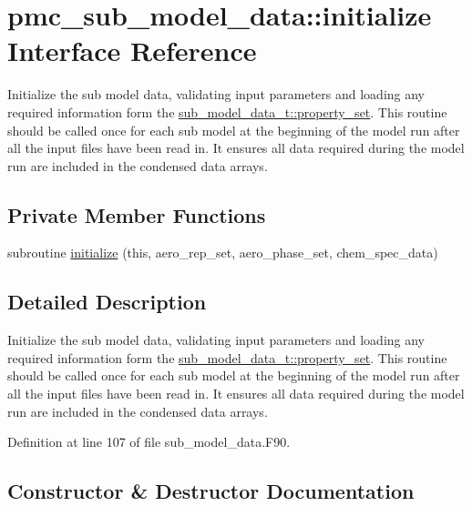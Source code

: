 \hypertarget{interfacepmc__sub__model__data_1_1initialize}{}\section{pmc\+\_\+sub\+\_\+model\+\_\+data\+:\+:initialize Interface Reference}
\label{interfacepmc__sub__model__data_1_1initialize}


Initialize the sub model data, validating input parameters and loading any required information form the {\ttfamily \mbox{\hyperlink{structpmc__sub__model__data_1_1sub__model__data__t_aeb00155797966fc95e75ad14d45e7242}{sub\+\_\+model\+\_\+data\+\_\+t\+::property\+\_\+set}}}. This routine should be called once for each sub model at the beginning of the model run after all the input files have been read in. It ensures all data required during the model run are included in the condensed data arrays.  


\subsection*{Private Member Functions}
\begin{DoxyCompactItemize}
\item 
subroutine \mbox{\hyperlink{interfacepmc__sub__model__data_1_1initialize_a2aef2b47ce1b068daed1414cb12f7b70}{initialize}} (this, aero\+\_\+rep\+\_\+set, aero\+\_\+phase\+\_\+set, chem\+\_\+spec\+\_\+data)
\end{DoxyCompactItemize}


\subsection{Detailed Description}
Initialize the sub model data, validating input parameters and loading any required information form the {\ttfamily \mbox{\hyperlink{structpmc__sub__model__data_1_1sub__model__data__t_aeb00155797966fc95e75ad14d45e7242}{sub\+\_\+model\+\_\+data\+\_\+t\+::property\+\_\+set}}}. This routine should be called once for each sub model at the beginning of the model run after all the input files have been read in. It ensures all data required during the model run are included in the condensed data arrays. 

Definition at line 107 of file sub\+\_\+model\+\_\+data.\+F90.



\subsection{Constructor \& Destructor Documentation}
\mbox{\label{interfacepmc__sub__model__data_1_1initialize_a2aef2b47ce1b068daed1414cb12f7b70}} 
